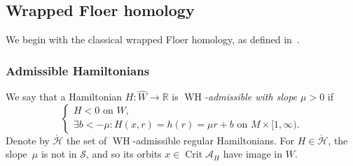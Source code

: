 \documentclass{amsart}
\newcommand{\Acal}{{\mathcal{A}}}
\newcommand{\Hcal}{{\mathcal{H}}}
\newcommand{\Scal}{{\mathcal{S}}}
\newcommand{\RR}{\mathbb{R}}
\newcommand{\WslantH}{\operatorname{WH}}
\newcommand{\Crit}{\operatorname{Crit}}
\newcommand{\haat}{\widehat}
\theoremstyle{definition}
\theoremstyle{remark}
\numberwithin{equation}{section}
\begin{document}
%
	

\subsection{Wrapped Floer homology}\label{sec:wh}
We begin with the classical wrapped Floer homology, as defined in~\cite{AS10}. 

\subsubsection*{Admissible Hamiltonians}
We say that a Hamiltonian $H:\haat W\to\RR$ is {\it $\WslantH$-admissible with slope $\mu>0$} if 
\begin{equation*}
	\begin{cases}
		H<0 \mbox{ on $W$,}	\\
		\exists b<-\mu\colon H(x,r)=h(r)=\mu r+b\mbox{ on $M\times[1,\infty)$.}
	\end{cases}
\label{acuteadmissible}
\end{equation*}
Denote by $\acute\Hcal$ the set of $\WslantH$-admissible regular Hamiltonians. For $H\in\acute\Hcal$, the slope~$\mu$ is not in $\Scal$, and so its orbits $x\in\Crit\Acal_H$ have image in $W$. 
\end{document}
